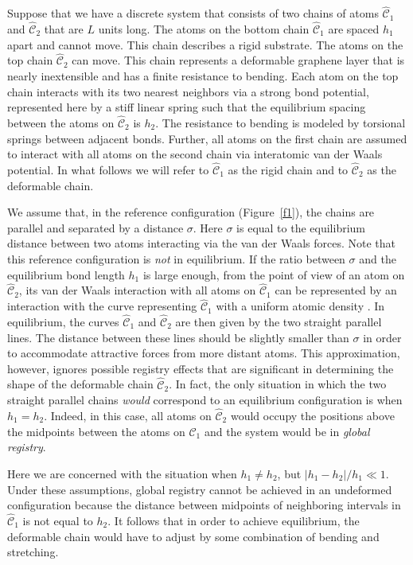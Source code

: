 \documentclass{siamltex}
\begin{document}
Suppose that we have a discrete system that consists of
two chains of atoms $\hat{\mathcal C}_1$ and $\hat{\mathcal C}_2$ that are $L$
units long. The atoms on the bottom chain $\hat{\mathcal C}_1$ are spaced
$h_1$ apart and cannot move. This chain describes a rigid
substrate. The atoms on the top chain $\hat{\mathcal C}_2$ can move. This 
chain represents a deformable graphene layer that is nearly
inextensible and has a finite resistance to bending.  Each atom on the
top chain interacts with its two nearest neighbors via a strong
bond potential, represented here by a stiff linear spring such that
the equilibrium spacing between the atoms on $\hat{\mathcal C}_2$ is
$h_2$. The resistance to bending is modeled by torsional springs
between adjacent bonds. Further, all atoms on the first chain are
assumed to interact with all atoms on the second chain via interatomic
van der Waals potential. In what follows we will refer to $\hat{\mathcal C}_1$ as the rigid chain and to $\hat{\mathcal C}_2$ as the deformable chain.

We assume that, in the reference configuration (Figure~\ref{f1}), the chains are
parallel and separated by a distance $\sigma$. Here $\sigma$ is equal
to the equilibrium distance between two atoms interacting via the van der Waals forces. Note that this reference configuration is {\em not} in equilibrium. If the ratio between $\sigma$ and the equilibrium bond length $h_1$ is large enough, from the point of view of an atom on $\hat{\mathcal C}_2$, its van der Waals interaction with all atoms on $\hat{\mathcal C}_1$ can be represented by an interaction with the curve representing $\hat{\mathcal C}_1$ with a uniform
atomic density \cite{wilber2007continuum}. In equilibrium, the curves  $\hat{\mathcal C}_1$ and $\hat{\mathcal C}_2$ are then given by the two straight parallel lines.  The distance between these lines should be slightly smaller than $\sigma$ in order to accommodate attractive forces from more distant atoms. This approximation, however, ignores possible registry
effects that are significant in determining the shape of the
deformable chain $\hat{\mathcal C}_2$. In fact, the only situation in which
the two straight parallel chains {\it would} correspond to an equilibrium
configuration is when $h_1=h_2$. Indeed, in this case, all atoms on
$\hat{\mathcal C}_2$ would occupy the positions above the midpoints between
the atoms on $\hat{\mathcal C}_1$ and the system would be in {\it global
  registry}.

Here we are concerned with the situation when $h_1\neq h_2$, but
$|h_1-h_2|/h_1\ll1$. Under these assumptions, global registry cannot
be achieved in an undeformed configuration because the distance
between midpoints of neighboring intervals in $\hat{\mathcal C}_1$ is not
equal to $h_2$. It follows that in order to achieve equilibrium, the
deformable chain would have to adjust by some combination of bending
and stretching.
\end{document}
